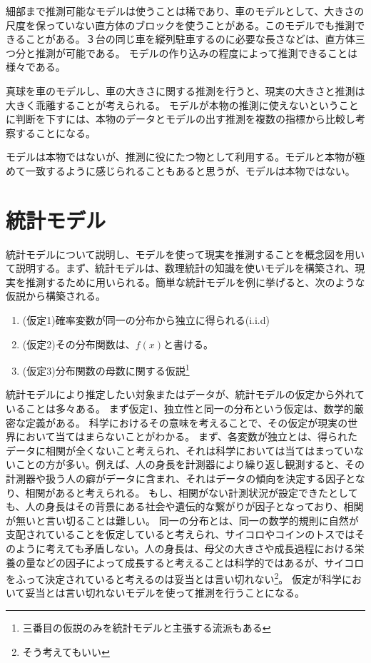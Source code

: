 細部まで推測可能なモデルは使うことは稀であり、車のモデルとして、大きさの尺度を保っていない直方体のブロックを使うことがある。このモデルでも推測できることがある。３台の同じ車を縦列駐車するのに必要な長さなどは、直方体三つ分と推測が可能である。
モデルの作り込みの程度によって推測できることは様々である。

真球を車のモデルし、車の大きさに関する推測を行うと、現実の大きさと推測は大きく乖離することが考えられる。
モデルが本物の推測に使えないということに判断を下すには、本物のデータとモデルの出す推測を複数の指標から比較し考察することになる。


モデルは本物ではないが、推測に役にたつ物として利用する。モデルと本物が極めて一致するように感じられることもあると思うが、モデルは本物ではない。



\section{統計モデル}
統計モデルについて説明し、モデルを使って現実を推測することを概念図を用いて説明する。まず、統計モデルは、数理統計の知識を使いモデルを構築され、現実を推測するために用いられる。簡単な統計モデルを例に挙げると、次のような仮説から構築される。

\begin{enumerate}
    \item (仮定1)確率変数が同一の分布から独立に得られる(i.i.d)
    \item (仮定2)その分布関数は、$f(x)$と書ける。
    \item (仮定3)分布関数の母数に関する仮説\footnote{三番目の仮説のみを統計モデルと主張する流派もある\cite{塩見_正衛2021}}
\end{enumerate}

統計モデルにより推定したい対象またはデータが、統計モデルの仮定から外れていることは多々ある。
まず仮定1、独立性と同一の分布という仮定は、数学的厳密な定義がある。
科学におけるその意味を考えることで、その仮定が現実の世界において当てはまらないことがわかる。
まず、各変数が独立とは、得られたデータに相関が全くないこと考えられ、それは科学においては当てはまっていないことの方が多い。例えば、人の身長を計測器により繰り返し観測すると、その計測器や扱う人の癖がデータに含まれ、それはデータの傾向を決定する因子となり、相関があると考えられる。
もし、相関がない計測状況が設定できたとしても、人の身長はその背景にある社会や遺伝的な繋がりが因子となっており、相関が無いと言い切ることは難しい。
同一の分布とは、同一の数学的規則に自然が支配されていることを仮定していると考えられ、サイコロやコインのトスではそのように考えても矛盾しない。人の身長は、母父の大きさや成長過程における栄養の量などの因子によって成長すると考えることは科学的ではあるが、サイコロをふって決定されていると考えるのは妥当とは言い切れない\footnote{そう考えてもいい}。
仮定が科学において妥当とは言い切れないモデルを使って推測を行うことになる。

